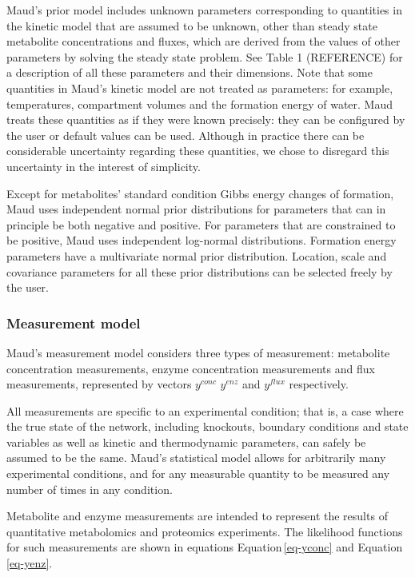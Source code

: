 \documentclass[journal=,manuscript=]{achemso}
\begin{document}
Maud's prior model includes unknown parameters corresponding to
quantities in the kinetic model that are assumed to be unknown, other
than steady state metabolite concentrations and fluxes, which are
derived from the values of other parameters by solving the steady state
problem. See Table 1 (REFERENCE) for a description of all these
parameters and their dimensions. Note that some quantities in Maud's
kinetic model are not treated as parameters: for example, temperatures,
compartment volumes and the formation energy of water. Maud treats these
quantities as if they were known precisely: they can be configured by
the user or default values can be used. Although in practice there can
be considerable uncertainty regarding these quantities, we chose to
disregard this uncertainty in the interest of simplicity.

Except for metabolites' standard condition Gibbs energy changes of
formation, Maud uses independent normal prior distributions for
parameters that can in principle be both negative and positive. For
parameters that are constrained to be positive, Maud uses independent
log-normal distributions. Formation energy parameters have a
multivariate normal prior distribution. Location, scale and covariance
parameters for all these prior distributions can be selected freely by
the user.

\hypertarget{measurement-model-1}{%
\subsubsection{Measurement model}\label{measurement-model-1}}

Maud's measurement model considers three types of measurement:
metabolite concentration measurements, enzyme concentration measurements
and flux measurements, represented by vectors \(𝑦^{𝑐𝑜𝑛𝑐}\) \(𝑦^{𝑒𝑛𝑧}\)
and \(𝑦^{𝑓𝑙𝑢𝑥}\) respectively.

All measurements are specific to an experimental condition; that is, a
case where the true state of the network, including knockouts, boundary
conditions and state variables as well as kinetic and thermodynamic
parameters, can safely be assumed to be the same. Maud's statistical
model allows for arbitrarily many experimental conditions, and for any
measurable quantity to be measured any number of times in any condition.

Metabolite and enzyme measurements are intended to represent the results
of quantitative metabolomics and proteomics experiments. The likelihood
functions for such measurements are shown in equations
Equation\,\eqref{eq-yconc} and Equation\,\eqref{eq-yenz}.
\end{document}
